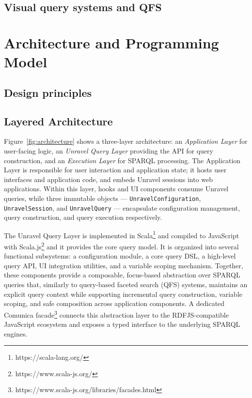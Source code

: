 \documentclass[
]{ceurart}
\begin{document}
\subsection{Visual query systems and QFS}




\section{Architecture and Programming Model}



\subsection{Design principles}






\subsection{Layered Architecture}

Figure~\ref{fig:architecture} shows a three-layer architecture: an
\emph{Application Layer} for user-facing logic, an \emph{Unravel Query
Layer} providing the API for query construction, and an \emph{Execution
Layer} for SPARQL processing. The Application Layer is responsible for
user interaction and application state; it hosts user interfaces and
application code, and embeds Unravel sessions into web applications.
Within this layer, hooks and UI components consume Unravel queries,
while three immutable objects — \texttt{UnravelConfiguration},
\texttt{UnravelSession}, and \texttt{UnravelQuery} — encapsulate
configuration management, query construction, and query execution
respectively.

The Unravel Query Layer is implemented in Scala\footnote{https://scala-lang.org/}
and compiled to JavaScript with Scala.js\footnote{https://www.scala-js.org/}
and it provides the core query model. It is organized into several
functional subsystems: a configuration module, a core query DSL, a
high-level query API, UI integration utilities, and a variable scoping
mechanism. Together, these components provide a composable, focus-based 
abstraction over SPARQL queries that, similarly to query-based faceted search (QFS)
systems, maintains an explicit query context while supporting
incremental query construction, variable scoping, and safe composition
across application components. 
A dedicated Comunica facade\footnote{https://www.scala-js.org/libraries/facades.html}
connects this abstraction layer to the RDFJS-compatible JavaScript
ecosystem and exposes a typed interface to the underlying SPARQL
engines.
\end{document}
